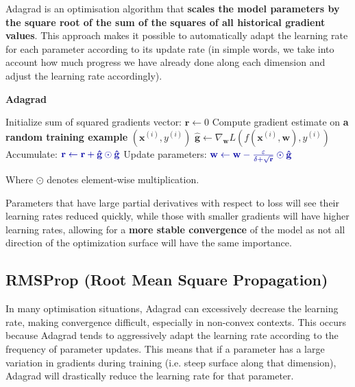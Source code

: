 Adagrad is an optimisation algorithm that \textbf{scales the model parameters by the square root of the sum of the squares of all historical gradient values}. This approach makes it possible to automatically adapt the learning rate for each parameter according to its update rate (in simple words, we take into account how much progress we have already done along each dimension and adjust the learning rate accordingly). 
\begin{algorithm}
\renewcommand\thealgorithm{}
\caption{\textbf{\textcolor{mygreen}{Adagrad}}}
\begin{algorithmic}[1]
\STATE Initialize sum of squared gradients vector: $\mathbf{r} \leftarrow 0$
\STATE Compute gradient estimate on \textbf{\textcolor{myred}{a random training example}} $(\mathbf{x}^{(i)}, y^{(i)})$
\STATE $\mathbf{\hat{g}} \leftarrow \nabla_{\mathbf{w}} L(f(\mathbf{x}^{(i)},\mathbf{w}), y^{(i)})$
\STATE Accumulate:
$\textcolor{mybluee}{\mathbf{r} \leftarrow \mathbf{r} + \mathbf{\hat{g}} \odot \mathbf{\hat{g}}}$
\STATE Update parameters:
$\textcolor{mybluee}{\mathbf{w} \leftarrow \mathbf{w} - \frac{\varepsilon}{\delta + \sqrt{\mathbf{r}}} \odot \mathbf{\hat{g}}}$ 
\ENDWHILE
\end{algorithmic}
\end{algorithm}

Where $\odot$ denotes element-wise multiplication.

Parameters that have large partial derivatives with respect to loss will see their learning rates reduced quickly, while those with smaller gradients will have higher learning rates, allowing for a \textbf{more stable convergence} of the model as not all direction of the optimization surface will have the same importance. 

\subsection{RMSProp (Root Mean Square Propagation)}

In many optimisation situations, Adagrad can excessively decrease the learning rate, making convergence difficult, especially in non-convex contexts. This occurs because Adagrad tends to aggressively adapt the learning rate according to the frequency of parameter updates. This means that if a parameter has a large variation in gradients during training (i.e. steep surface along that dimension), Adagrad will drastically reduce the learning rate for that parameter.

